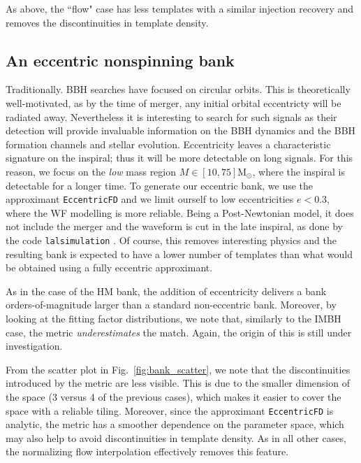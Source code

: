 \documentclass[twocolumn,showpacs,preprintnumbers,nofootinbib,prd,
superscriptaddress,10pt]{revtex4-2}
\begin{document}
As above, the ``flow" case has less templates with a similar injection recovery and removes the discontinuities in template density.

\subsection{An eccentric nonspinning bank}\label{sec:eccentric_bank}

Traditionally. BBH searches have focused on circular orbits.
This is theoretically well-motivated, as by the time of merger, any initial orbital eccentricty will be radiated away. Nevertheless it is interesting to search for such signals as their detection will provide invaluable information on the BBH dynamics and the BBH formation channels and stellar evolution.
Eccentricity leaves a characteristic signature on the inspiral; thus it will be more detectable on long signals. For this reason, we focus on the {\it low} mass region $M\in [10,75] \mathrm{M_\odot}$, where the inspiral is detectable for a longer time.
To generate our eccentric bank, we use the approximant \texttt{EccentricFD} \cite{PhysRevD.93.124061} and we limit ourself to low eccentricities $e<0.3$, where the WF modelling is more reliable. Being a Post-Newtonian model, it does not include the merger and the waveform is cut in the late inspiral, as done by the code \texttt{lalsimulation} \cite{lalsuite}. Of course, this removes interesting physics and the resulting bank is expected to have a lower number of templates than what would be obtained using a fully eccentric approximant.

As in the case of the HM bank, the addition of eccentricity delivers a bank orders-of-magnitude larger than a standard non-eccentric bank.
Moreover, by looking at the fitting factor distributions, we note that, similarly to the IMBH case, the metric {\it underestimates} the match. Again, the origin of this is still under investigation.

From the scatter plot in Fig.~\ref{fig:bank_scatter}, we note that the discontinuities introduced by the metric are less visible. This is due to the smaller dimension of the space (3 versus 4 of the previous cases), which makes it easier to cover the space with a reliable tiling. Moreover, since the approximant \texttt{EccentricFD} is analytic, the metric has a smoother dependence on the parameter space, which may also help to avoid discontinuities in template density.
As in all other cases, the normalizing flow interpolation effectively removes this feature.
\end{document}
